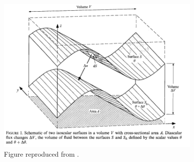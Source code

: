 \begin{figure}[htbp]
  \includegraphics[width=0.9\textwidth]{figs/winters-dasaro-temp-surfaces.png}
  \caption{Figure reproduced from \cite{Winters1996}.}
  \label{fig:wda-temp-surf}
\end{figure}

